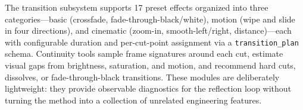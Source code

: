 ﻿\documentclass[11pt]{article}
\begin{document}
\begin{table}[t]
\caption{Tool taxonomy with functional grouping.}
\label{tab:tools}
\centering
\small
{}
\end{table}

The transition subsystem supports 17 preset effects organized into three
categories---basic (crossfade, fade-through-black/white), motion (wipe and
slide in four directions), and cinematic (zoom-in, smooth-left/right,
distance)---each with configurable duration and per-cut-point assignment via
a \texttt{transition\_plan} schema. Continuity tools sample frame signatures
around each cut, estimate visual gaps from brightness, saturation, and motion,
and recommend hard cuts, dissolves, or fade-through-black transitions. These
modules are deliberately lightweight: they provide observable diagnostics for
the reflection loop without turning the method into a collection of unrelated
engineering features.
\end{document}

